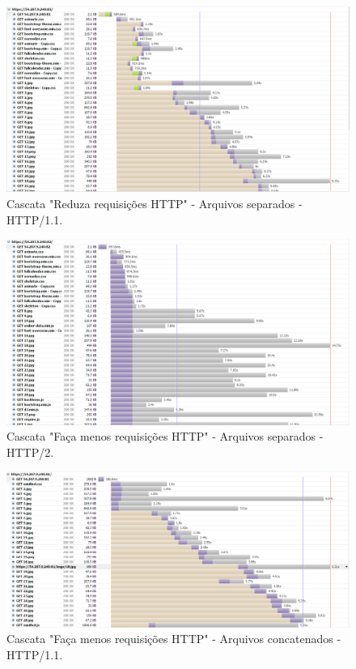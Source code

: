 \begin{figure}[!htb]
    \centering
    \caption{Cascata "Reduza requisições HTTP" - Arquivos separados - HTTP/1.1.}
    \includegraphics[width=1.0\textwidth]{./04-figuras/cascatas/separados_http11}
\end{figure}

\begin{figure}[!htb]
    \centering
    \caption{Cascata "Faça menos requisições HTTP" - Arquivos separados - HTTP/2.}
    \includegraphics[width=1.0\textwidth]{./04-figuras/cascatas/separados_http2}
\end{figure}

\begin{figure}[!htb]
    \centering
    \caption{Cascata "Faça menos requisições HTTP" - Arquivos concatenados - HTTP/1.1.}
    \includegraphics[width=1.0\textwidth]{./04-figuras/cascatas/concatenado_http11}
\end{figure}

